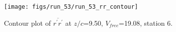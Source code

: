 \begin{figure}[H]
\centering
\texttt{[image: figs/run\_53/run\_53\_rr\_contour]}
\caption{Contour plot of $\overline{r^\prime r^\prime}$ at $z/c$=9.50, $V_{free}$=19.08, station 6.}
\end{figure}



